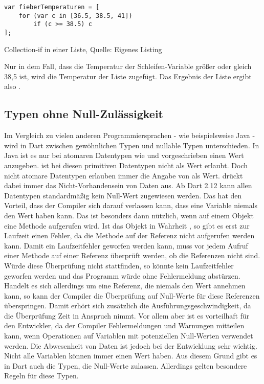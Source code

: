 \ifIncludeFigures
  \begin{listing}[ht]
    \begin{verbatim}
var fieberTemperaturen = [
    for (var c in [36.5, 38.5, 41])
        if (c >= 38.5) c
];
\end{verbatim}
    \caption[Collection-if in einer Liste]{Collection-if in einer Liste, Quelle: Eigenes Listing}
    \label{lst:CollectionIfInEinerListe}
  \end{listing}
\fi

Nur in dem Fall, dass die Temperatur der Schleifen-Variable  größer oder gleich 38,5 ist, wird die Temperatur der Liste zugefügt.
Das Ergebnis der Liste  ergibt also \IC{[38.5, 41]}.


\subsection{Typen ohne Null-Zulässigkeit} Im Vergleich zu vielen anderen Programmiersprachen - wie beispielsweise Java - wird in Dart zwischen gewöhnlichen Typen und nullable Typen unterschieden.
In Java ist es nur bei atomaren Datentypen wie  und  vorgeschrieben einen Wert anzugeben.
 ist bei diesen primitiven Datentypen nicht als Wert erlaubt.
Doch nicht atomare Datentypen erlauben immer die Angabe von  als Wert.
 drückt dabei immer das Nicht-Vorhandensein von Daten aus.
Ab Dart 2.12   kann allen Datentypen standardmäßig kein Null-Wert zugewiesen werden. Das hat den Vorteil, dass der Compiler sich darauf verlassen kann, dass eine Variable niemals den Wert  haben kann. Das ist besonders dann nützlich, wenn auf einem Objekt eine Methode aufgerufen wird. Ist das Objekt in Wahrheit , so gibt es erst zur Laufzeit einen Fehler, da die Methode auf der Referenz  nicht aufgerufen werden kann. Damit ein Laufzeitfehler geworfen werden kann, muss vor jedem Aufruf einer Methode auf einer Referenz überprüft werden, ob die Referenzen nicht  sind. Würde diese Überprüfung nicht stattfinden, so könnte kein Laufzeitfehler geworfen werden und das Programm würde ohne Fehlermeldung abstürzen. Handelt es sich allerdings um eine Referenz, die niemals den Wert  annehmen kann, so kann der Compiler die Überprüfung auf Null-Werte für diese Referenzen überspringen. Damit erhört sich zusätzlich die Ausführungsgeschwindigkeit, da die Überprüfung Zeit in Anspruch nimmt. Vor allem aber ist es vorteilhaft für den Entwickler, da der Compiler  Fehlermeldungen und Warnungen mitteilen kann, wenn Operationen auf Variablen mit potenziellen Null-Werten verwendet werden. Die Abwesenheit von Daten ist jedoch bei der Entwicklung sehr wichtig. Nicht alle Variablen können immer einen Wert haben. Aus diesem Grund gibt es in Dart auch die Typen, die Null-Werte zulassen. Allerdings gelten besondere Regeln für diese Typen.


